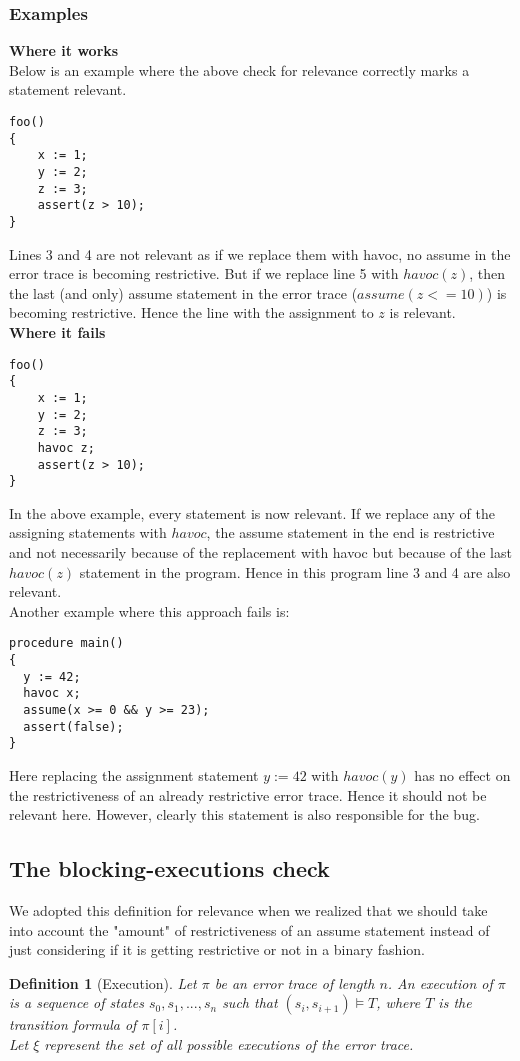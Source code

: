 \documentclass{article}
\newtheorem{mydef}{Definition}
\begin{document}
\subsubsection{Examples}
\textbf{Where it works} \\
Below is an example where the above check for relevance correctly marks a statement relevant.
\newpage
\begin{lstlisting}
foo()
{
	x := 1;
	y := 2;
	z := 3;
	assert(z > 10);
}
\end{lstlisting}
Lines 3 and 4 are not relevant as if we replace them with havoc, no assume in the error trace is becoming restrictive. But if we replace line 5 with $havoc(z)$, then the last (and only) assume statement in the error trace ($assume(z<=10)$) is becoming restrictive. Hence the line with the assignment to $z$ is relevant. \\
\textbf{Where it fails}
\begin{lstlisting}
foo()
{
	x := 1;
	y := 2;
	z := 3;
	havoc z;
	assert(z > 10);
}
\end{lstlisting}
In the above example, every statement is now relevant. If we replace any of the assigning statements with $havoc$, the assume statement in the end is restrictive and not necessarily because of the replacement with havoc but because of the last $havoc(z)$ statement in the program. Hence in this program line 3 and 4 are also relevant.\\
Another example where this approach fails is:
\begin{lstlisting}
procedure main()
{
  y := 42;
  havoc x;
  assume(x >= 0 && y >= 23);
  assert(false);
}
\end{lstlisting}
Here replacing the assignment statement $y:=42$ with $havoc(y)$ has no effect on the restrictiveness of an already restrictive error trace. Hence it should not be relevant here. However, clearly this statement is also responsible for the bug.

\subsection{The blocking-executions check}
We adopted this definition for relevance when we realized that we should take into account the "amount" of restrictiveness of an assume statement instead of just considering if it is getting restrictive or not in a binary fashion.
\begin{mydef}[Execution]\label{mydef:execution_definition}
Let $\pi$ be an error trace of length $n$. An \emph{execution} of $\pi$ is a sequence of states $s_0, s_1, ..., s_n$ such that $(s_i, s_{i+1}) \models T$, where $T$ is the transition formula of $\pi[i]$. \\
Let $\xi$ represent the set of all possible executions of the error trace.
\end{mydef}
\end{document}

